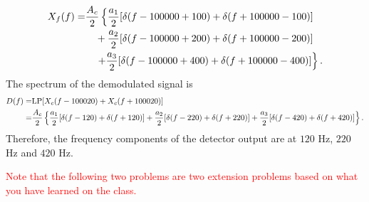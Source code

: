 \documentclass{assignment}
\begin{document}
\begin{sol}
\begin{itemize}
\begin{align}
            \notag X_f(f)=&\frac{A_c}{2}\left\{\frac{a_1}{2}[\delta(f-100000+100)+\delta(f+100000-100)]\right.\\
            \notag&\quad+\frac{a_2}{2}[\delta(f-100000+200)+\delta(f+100000-200)]\\
            &\quad\left.+\frac{a_3}{2}[\delta(f-100000+400)+\delta(f+100000-400)]\right\}.
        \end{align}
        The spectrum of the demodulated signal is
        \begin{align}
            \notag D(f)=&\text{LP}[X_c(f-100020)+X_c(f+100020)]\\
            =&\frac{A_c}{2}\left\{\frac{a_1}{2}[\delta(f-120)+\delta(f+120)]+\frac{a_2}{2}[\delta(f-220)+\delta(f+220)]+\frac{a_3}{2}[\delta(f-420)+\delta(f+420)]\right\}.
        \end{align}
        Therefore, the frequency components of the detector output are at $120$ Hz, $220$ Hz and $420$ Hz.
    \end{itemize}
\end{sol}

\noindent\textcolor{red}{Note that the following two problems are two extension problems based on what you have learned on the class.}
\end{document}
